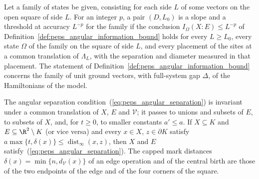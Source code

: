 \begin{definition}
    \label{def:peps_angular_scale}
    \leanok
    Let a family of states be given, consisting for each side $L$ of some
    vectors on the open square of side $L$. For an integer $p$, a pair
    $(D,L_0)$ is a slope and a threshold at accuracy $L^{-p}$ for the family if
    the conclusion $I_\Omega(X:E)\le L^{-p}$ of
    Definition~\ref{def:peps_angular_information_bound} holds for every
    $L\ge L_0$, every state $\Omega$ of the family on the square of side $L$,
    and every placement of the sites at a common translation of $\Lambda_L$,
    with the separation and diameter measured in that placement. The statement
    of Definition~\ref{def:peps_angular_information_bound} concerns the family
    of unit ground vectors, with full-system gap $\Delta$, of the Hamiltonians
    of the model.
\end{definition}

\begin{lemma}
    \label{lem:peps_angular_separation_checks}
    \leanok
    The angular separation condition~(\ref{eq:peps_angular_separation}) is invariant under a common translation
    of $X$, $E$ and $\mathcal V$; it passes to unions and subsets of $E$,
    to subsets of $X$, and, for $t\ge0$, to smaller constants $a'\le a$. If $X\subseteq K$ and $E\subseteq\R^2\setminus K$ (or vice versa)
    and every $x\in X$, $z\in\partial K$ satisfy
    $a\max\{t,\delta(x)\}\le\operatorname{dist}_\infty(x,z)$, then $X$ and $E$ satisfy~(\ref{eq:peps_angular_separation}). The
    capped mark distances $\delta(x)=\min\{n,d_{\mathcal V}(x)\}$ of an edge operation and of the central birth are
    those of the two endpoints of the edge and of the four corners of the
    square.
\end{lemma}

